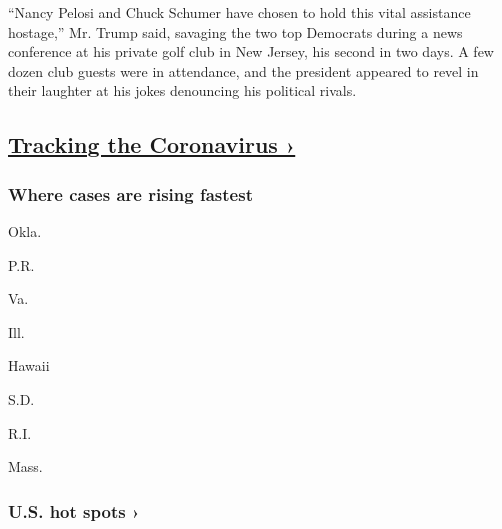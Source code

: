 ``Nancy Pelosi and Chuck Schumer have chosen to hold this vital
assistance hostage,'' Mr. Trump said, savaging the two top Democrats
during a news conference at his private golf club in New Jersey, his
second in two days. A few dozen club guests were in attendance, and the
president appeared to revel in their laughter at his jokes denouncing
his political rivals.

\hypertarget{tracking-the-coronavirus-}{%
\subsection{\texorpdfstring{\href{https://www.nytimes.com/interactive/2020/us/coronavirus-us-cases.html}{Tracking
the Coronavirus
›}}{Tracking the Coronavirus ›}}\label{tracking-the-coronavirus-}}

\href{https://www.nytimes.com/interactive/2020/us/coronavirus-us-cases.html}{}

\hypertarget{where-cases-are-rising-fastest}{%
\subsubsection{\texorpdfstring{Where cases are \textbf{rising}
fastest}{Where cases are rising fastest}}\label{where-cases-are-rising-fastest}}

\href{https://www.nytimes.com/interactive/2020/us/oklahoma-coronavirus-cases.html}{}

Okla.
\href{https://www.nytimes.com/interactive/2020/us/puerto-rico-coronavirus-cases.html}{}

P.R.
\href{https://www.nytimes.com/interactive/2020/us/virginia-coronavirus-cases.html}{}

Va.
\href{https://www.nytimes.com/interactive/2020/us/illinois-coronavirus-cases.html}{}

Ill.
\href{https://www.nytimes.com/interactive/2020/us/hawaii-coronavirus-cases.html}{}

Hawaii
\href{https://www.nytimes.com/interactive/2020/us/south-dakota-coronavirus-cases.html}{}

S.D.
\href{https://www.nytimes.com/interactive/2020/us/rhode-island-coronavirus-cases.html}{}

R.I.
\href{https://www.nytimes.com/interactive/2020/us/massachusetts-coronavirus-cases.html}{}

Mass.

\href{https://www.nytimes.com/interactive/2020/us/coronavirus-us-cases.html}{}

\hypertarget{us-hot-spots-}{%
\subsubsection{U.S. hot spots ›}\label{us-hot-spots-}}

